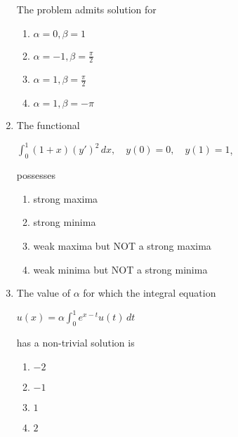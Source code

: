 \documentclass[journal]{IEEEtran}
\theoremstyle{remark}
\begin{document}
\begin{enumerate}
\begin{center}
                \end{center}
                The problem admits solution for 
                \begin{multicols}{2}
                \begin{enumerate}
                    \item $\alpha=0,\beta=1$
                    \item $\alpha=-1,\beta=\frac{\pi}{2}$
                    \item $\alpha=1,\beta=\frac{\pi}{2}$
                    \item $\alpha=1,\beta=-\pi$
                \end{enumerate}
                    
                \end{multicols}

                \item The functional 
                \begin{center}
                    $\int_{0}^{1} (1+x)(y')^2 \, dx, \quad y(0) = 0, \quad y(1) = 1$,
                \end{center}
                possesses
                \begin{enumerate}
                    \item strong maxima 
                    \item strong minima 
                    \item weak maxima but NOT a strong maxima 
                    \item weak minima but NOT a strong minima 
                \end{enumerate}

                \item The value of $\alpha$ for which the integral equation 
                \begin{center}
                    $u(x) = \alpha \int_{0}^{1} e^{x-t} u(t) \, dt$
                \end{center}
                has a non-trivial solution is 
                \begin{multicols}{4}
                \begin{enumerate}
                    \item $-2$
                    \item $-1$
                    \item $1$
                    \item $2$
                \end{enumerate}
                    

\end{multicols}
\end{enumerate}
\end{document}
